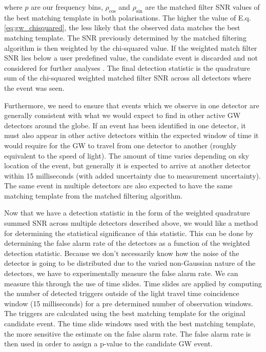 where $p$ are our frequency bins, $\rho_{\mathrm{cos}}$ and $\rho_{\mathrm{sin}}$ are the matched filter \ac{SNR} values of the best matching template in both polarisations. The higher the value of E.q. \ref{eq:gw_chisquared}, the less likely that the observed data matches the best matching template. The \ac{SNR} previously determined by the matched filtering algorithm is then weighted by the chi-squared value. If the weighted match filter \ac{SNR} lies below a user predefined value, the candidate event is discarded and not considered for further analyses \cite{0264-9381-33-21-215004}. The final detection statistic is the quadrature sum of the chi-squared weighted matched filter \ac{SNR} across all detectors where the event was seen.

%
%
Furthermore, we need to ensure that events which we observe in one detector are generally consistent with what we would expect to find in other active \ac{GW} detectors around the globe. If an event has been identified in one detector, it must also appear in other active detectors within the expected window of time it would require for the \ac{GW} to travel from one detector to another (roughly equivalent to the speed of light). The amount of time varies depending on sky location of the event, but generally it is expected to arrive at another detector within 15 milliseconds (with added uncertainty due to measurement uncertainty). The same event in multiple detectors are also expected to have the same matching template from the matched filtering algorithm.

%
Now that we have a detection statistic in the form of the weighted quadrature summed \ac{SNR} across multiple detectors described above, we would like a method for determining the statistical significance of this statistic. This can be done by determining the false alarm rate of the detectors as a function of the weighted detection statistic. Because we don't necessarily know how the noise of the detector is going to be distributed due to the varied non-Gaussian nature of the detectors, we have to experimentally measure the false alarm rate. We can measure this through the use of time slides. Time slides are applied by computing the number of detected triggers outside of the light travel time coincidence window (15 milliseconds) for a pre determined number of observation windows. The triggers are calculated using the best matching template for the original candidate event. The time slide windows used with the best matching template, the more sensitive the estimate on the false alarm rate. The false alarm rate is then used in order to assign a p-value to the candidate \ac{GW} event.

